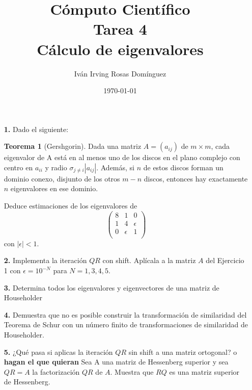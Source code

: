 \documentclass[letterpaper]{article}
\title{\textbf{Cómputo Científico\\Tarea 4\\Cálculo de eigenvalores}}
\author{Iván Irving Rosas Domínguez}
\date{\today}
\newcommand{\1}{\mathds{1}}
\theoremstyle{definition}
\theoremstyle{definition}
\newtheorem{teo}{Teorema}
\theoremstyle{definition}
\theoremstyle{definition}
\theoremstyle{definition}
\begin{document}
\maketitle


\begin{enumerate}
    \item[\textbf{1.}] Dado el siguiente:
    \begin{teo}[Gershgorin]
        Dada una matriz $A=(a_{ij})$ de $m\times m$, cada eigenvalor de A está en al menos
        uno de los discos en el plano complejo con centro en $a_{ii}$ y radio $\sigma_{j\neq i}|a_{ij}|$. 
        Además, si $n$ de estos discos forman un dominio conexo, disjunto de los otros $m-n$ discos, 
        entonces hay exactamente $n$ eigenvalores en ese dominio.
    \end{teo}
    Deduce estimaciones de los eigenvalores de 
\[
    \begin{pmatrix}
    8 & 1 & 0\\
    1 & 4 & \epsilon\\
    0 & \epsilon & 1\\    
    \end{pmatrix}
    \]
    con $|\epsilon|<1$.
    \item[\textbf{2.}] Implementa la iteración $QR$ con shift. Aplícala a la matriz $A$ del Ejercicio 1 con 
    $\epsilon=10^{-N}$ para $N=1,3,4,5$.
    \item[\textbf{3.}]Determina todos los eigenvalores y eigenvectores de una matriz de Householder
    \item[\textbf{4.}]Demuestra que no es posible construir la transformación de similaridad del Teorema
    de Schur con un número finito de transformaciones de similaridad de Householder.
    \item[\textbf{5.}]¿Qué pasa si aplicas la iteración $QR$ sin shift a una matriz ortogonal?
    o \textbf{hagan el que quieran} Sea A una matriz de Hessenberg superior y sea $QR=A$ la
    factorización $QR$ de $A$. Muestra que $RQ$ es una matriz superior de Hessenberg.
\end{enumerate}
\end{document}
